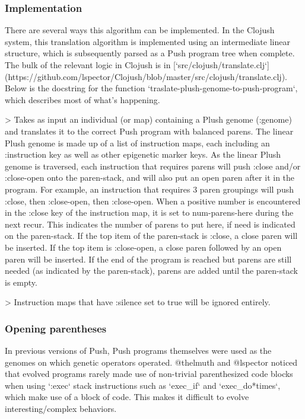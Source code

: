 \subsubsection{ Implementation}

There are several ways this algorithm can be implemented. In the Clojush system, this translation algorithm is implemented using an intermediate linear structure, which is subsequently parsed as a Push program tree when complete. The bulk of the relevant logic in Clojush is in [`src/clojush/translate.clj`](https://github.com/lspector/Clojush/blob/master/src/clojush/translate.clj). Below is the docstring for the function `traslate-plush-genome-to-push-program`, which describes most of what's happening.

> Takes as input an individual (or map) containing a Plush genome (:genome) and translates it to the correct Push program with balanced parens. The linear Plush genome is made up of a list of instruction maps, each including an :instruction key as well as other epigenetic marker keys. As the linear Plush genome is traversed, each instruction that requires parens will push :close and/or :close-open onto the paren-stack, and will also put an open paren after it in the program. For example, an instruction that requires 3 paren groupings will push :close, then :close-open, then :close-open. When a positive number is encountered in the :close key of the instruction map, it is set to num-parens-here during the next recur. This indicates the number of parens to put here, if need is indicated on the paren-stack. If the top item of the paren-stack is :close, a close paren will be inserted. If the top item is :close-open, a close paren followed by an open paren will be inserted. If the end of the program is reached but parens are still needed (as indicated by the paren-stack), parens are added until the paren-stack is empty.

> Instruction maps that have :silence set to true will be ignored entirely.

\subsubsection{ Opening parentheses}

In previous versions of Push, Push programs themselves were used as the genomes on which genetic operators operated. @thelmuth and @lspector noticed that evolved programs rarely made use of non-trivial parenthesized code blocks when using `:exec` stack instructions such as `exec\_if` and `exec\_do*times`, which make use of a block of code. This makes it difficult to evolve interesting/complex behaviors.

